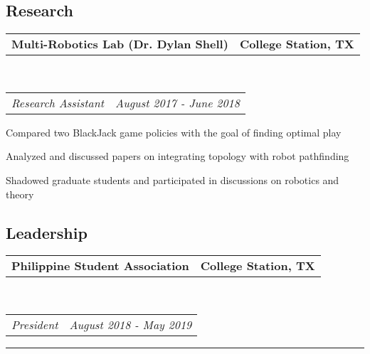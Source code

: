 \documentclass[10pt,letterpaper]{article}
\makeatletter
\newenvironment{indentsection}[1]%
{\begin{list}{}%
	{\setlength{\leftmargin}{#1}}%
	\item[]%
}
{\end{list}}
\newcommand{\headerrow}[2]
{\begin{tabular*}{\linewidth}{l@{\extracolsep{\fill}}r}
	#1 &
	#2 \\
\end{tabular*}}
\makeatother
\begin{document}
\vspace{-1.8em}
\subsection*{Research}
\begin{indentsection}{\parindent}
	\vspace{-0.4em}
	\headerrow
		{\textbf{Multi-Robotics Lab (Dr. Dylan Shell)}}
		{\textbf{College Station, TX}}
	\\
	\headerrow
		{\emph{Research Assistant}}
		{\emph{August 2017 - June 2018}}
	\begin{itemize*}
		\item Compared two BlackJack game policies with the goal of finding optimal play 
		\item Analyzed and discussed papers on integrating topology with robot pathfinding
		\item Shadowed graduate students and participated in discussions on robotics and theory
	\end{itemize*}
\end{indentsection}

\vspace{-1.8em}
\subsection*{Leadership}
\begin{indentsection}{\parindent}
	\vspace{-0.4em}
	\headerrow
		{\textbf{Philippine Student Association}}
		{\textbf{College Station, TX}}
		\\
	\headerrow
		{\emph{President}}
		{\emph{August 2018 - May 2019}}

\end{indentsection}
\newif\ifdraft
\draftfalse %

\ifdraft
\hrule
\vspace{-0.8em}
\end{document}

